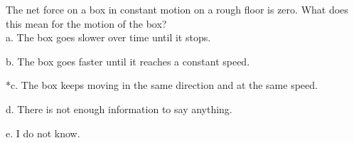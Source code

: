 
The net force on a box in constant motion on a rough floor is zero. What does this mean for the motion of the box? \\

a. The box goes slower over time until it stops.

b. The box goes faster until it reaches a constant speed.

*c. The box keeps moving in the same direction and at the same speed.

d. There is not enough information to say anything.

e. I do not know. \\
